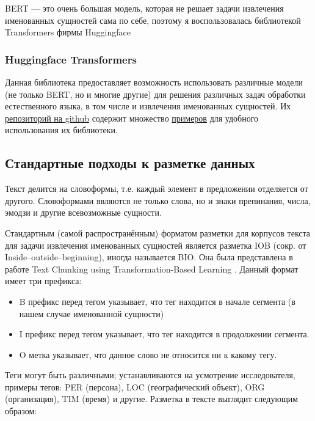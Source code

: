 BERT --- это очень большая модель, которая не решает задачи извлечения именованных сущностей сама по себе, поэтому я воспользовалась библиотекой Transformers фирмы Huggingface \cite{Wolf2019HuggingFacesTS}

\subsubsection{Huggingface Transformers}

Данная библиотека предоставляет возможность использовать различные  модели (не только BERT, но и многие другие) для решения различных задач обработки естественного языка, в том числе и извлечения именованных сущностей.
Их \href{https://github.com/huggingface/transformers}{репозиторий на github} содержит множество \href{https://github.com/huggingface/transformers/tree/master/examples/}{примеров} для удобного использования их библиотеки.


\subsection{Стандартные подходы к разметке данных}

Текст делится на словоформы, т.е. каждый элемент в предложении отделяется от другого. Словоформами являются не только слова, но и знаки препинания, числа, эмодзи и другие всевозможные сущности.

Стандартным (самой распространённым) форматом разметки для корпусов текста для задачи извлечения именованных сущностей является разметка IOB (сокр. от Inside–outside–beginning), иногда называется BIO. Она была представлена в работе Text Chunking using Transformation-Based Learning \cite{DBLP:journals/corr/cmp-lg-9505040}. Данный формат имеет три префикса:
\begin{itemize}
\item B префикс перед тегом указывает, что тег находится в начале сегмента (в нашем случае именованной сущности)
\item I префикс перед тегом указывает, что тег находится в продолжении сегмента.
\item O метка указывает, что данное слово не относится ни к какому тегу. 
\end{itemize}
 
Теги могут быть различными; устанавливаются на усмотрение исследователя, примеры тегов: PER (персона), LOC (географический объект), ORG (организация), TIM (время) и другие. Разметка в тексте выглядит следующим образом:

